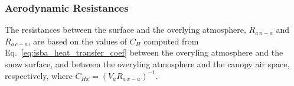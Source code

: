 \subsubsection{Aerodynamic Resistances}
\label{sec:meb_resistances} 

The resistances between the surface and the overlying atmosphere, $R_{a\,n-a}$
and $R_{a\,c-a}$, are based on the values of $C_H$ 
computed from Eq.~\ref{eq:isba_heat_transfer_coef}
between
the overyling atmosphere and the snow surface, and between
the overyling atmosphere and the canopy air space, respectively, where
$C_{Hx}={\left(V_a R_{a\,x-a}\right)}^{-1}$.



